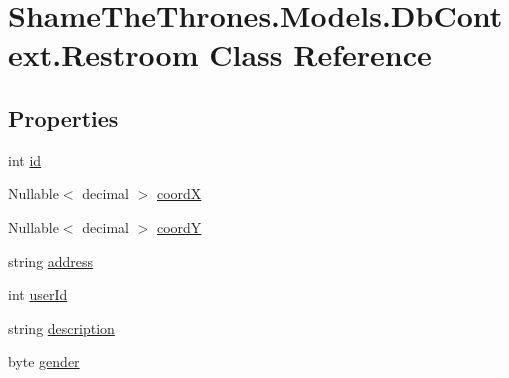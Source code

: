 \hypertarget{class_shame_the_thrones_1_1_models_1_1_db_context_1_1_restroom}{}\section{Shame\+The\+Thrones.\+Models.\+Db\+Context.\+Restroom Class Reference}
\label{class_shame_the_thrones_1_1_models_1_1_db_context_1_1_restroom}
\subsection*{Properties}
\begin{DoxyCompactItemize}
\item 
int \hyperlink{class_shame_the_thrones_1_1_models_1_1_db_context_1_1_restroom_ad4c5a8b8e83be391dbcafee52aed13e1}{id}
\item 
Nullable$<$ decimal $>$ \hyperlink{class_shame_the_thrones_1_1_models_1_1_db_context_1_1_restroom_a41773e3b9f45c065e90c12c75fbf4e88}{coordX}
\item 
Nullable$<$ decimal $>$ \hyperlink{class_shame_the_thrones_1_1_models_1_1_db_context_1_1_restroom_a217ab16f7b3d11811700f3891bb7b1c0}{coordY}
\item 
string \hyperlink{class_shame_the_thrones_1_1_models_1_1_db_context_1_1_restroom_a5728143f63dd23c76c49f815fa61a18b}{address}
\item 
int \hyperlink{class_shame_the_thrones_1_1_models_1_1_db_context_1_1_restroom_ab03e35cceefb91c5b547a6dbb3988080}{user\+Id}
\item 
string \hyperlink{class_shame_the_thrones_1_1_models_1_1_db_context_1_1_restroom_adcf35041e546ff96019ea0d927159156}{description}
\item 
byte \hyperlink{class_shame_the_thrones_1_1_models_1_1_db_context_1_1_restroom_a194822538c3cd2198a9435213c6c9df1}{gender}

\end{DoxyCompactItemize}

